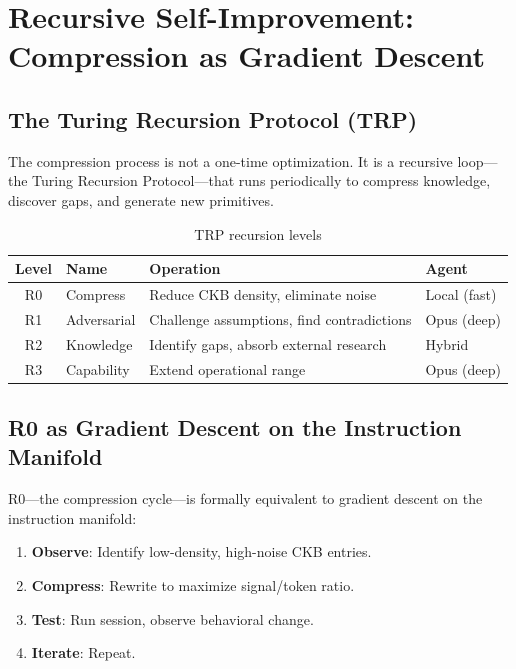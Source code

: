 \documentclass[11pt, a4paper]{article}
\begin{document}
\section{Recursive Self-Improvement: Compression as Gradient Descent}
\label{sec:rsi}

\subsection{The Turing Recursion Protocol (TRP)}

The compression process is not a one-time optimization. It is a recursive loop---the Turing Recursion Protocol---that runs periodically to compress knowledge, discover gaps, and generate new primitives.

\begin{table}[h]
\centering
\caption{TRP recursion levels}
\label{tab:trp}
\begin{tabular}{@{}clll@{}}
\toprule
\textbf{Level} & \textbf{Name} & \textbf{Operation} & \textbf{Agent} \\
\midrule
R0 & Compress & Reduce CKB density, eliminate noise & Local (fast) \\
R1 & Adversarial & Challenge assumptions, find contradictions & Opus (deep) \\
R2 & Knowledge & Identify gaps, absorb external research & Hybrid \\
R3 & Capability & Extend operational range & Opus (deep) \\
\bottomrule
\end{tabular}
\end{table}

\subsection{R0 as Gradient Descent on the Instruction Manifold}

R0---the compression cycle---is formally equivalent to gradient descent on the instruction manifold:

\begin{enumerate}[leftmargin=*]
    \item \textbf{Observe}: Identify low-density, high-noise CKB entries.
    \item \textbf{Compress}: Rewrite to maximize signal/token ratio.
    \item \textbf{Test}: Run session, observe behavioral change.
    \item \textbf{Iterate}: Repeat.
\end{enumerate}
\end{document}
